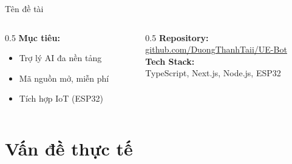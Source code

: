 \documentclass[aspectratio=169,12pt]{beamer}
\begin{document}
\begin{frame}{Tên đề tài}
    \begin{center}
    \end{center}

    \vspace{0.5cm}

    \begin{columns}[T]
        \begin{column}{0.5\textwidth}
            \textbf{ Mục tiêu:}
            \begin{itemize}
                \item Trợ lý AI đa nền tảng
                \item Mã nguồn mở, miễn phí
                \item Tích hợp IoT (ESP32)
            \end{itemize}
        \end{column}
        \begin{column}{0.5\textwidth}
            \textbf{ Repository:}\\
            \url{github.com/DuongThanhTaii/UE-Bot}\\[0.3cm]
            \textbf{ Tech Stack:}\\
            TypeScript, Next.js, Node.js, ESP32
        \end{column}
    \end{columns}
\end{frame}

\section{Vấn đề thực tế}
\end{document}
